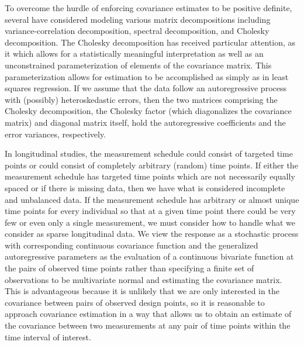 \documentclass[12pt]{article}
\theoremstyle{definition}
\begin{document}
\bigskip

To overcome the hurdle of enforcing covariance estimates to be positive definite, several have considered modeling various matrix decompositions including variance-correlation decomposition, spectral decomposition, and Cholesky decomposition. The Cholesky decomposition has received particular attention, as it which allows for a statistically meaningful interpretation as well as an unconstrained parameterization of elements of the covariance matrix. This parameterization allows for estimation to be accomplished as simply as in least squares regression. If we assume that the data follow an autoregressive process with (possibly) heteroskedastic errors, then the two matrices comprising the Cholesky decomposition, the Cholesky factor (which diagonalizes the covariance matrix) and diagonal matrix itself, hold the autoregressive coefficients and the error variances, respectively.

\bigskip

In longitudinal studies, the measurement schedule could consist of targeted time points or could consist of completely arbitrary (random) time points. If either the measurement schedule has targeted time points which are not necessarily equally spaced or if there is missing data, then we have what is considered incomplete and unbalanced data. If the measurement schedule has arbitrary or almost unique time points for every individual so that at a given time point there could be very few or even only a single measurement, we must consider how to handle what we consider as sparse longitudinal data. We view the response as a stochastic process with corresponding continuous covariance function and the generalized autoregressive parameters as the evaluation of a continuous bivariate function at the pairs of observed time points rather than specifying a finite set of observations to be multivariate normal and estimating the covariance matrix. This is advantageous because it is unlikely that we are only interested in the covariance between pairs of observed design points, so it is reasonable to approach covariance estimation in a way that allows us to obtain an estimate of the covariance between two measurements at any pair of time points within the time interval of interest. 

\bigskip
\end{document}
